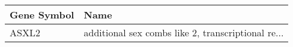 \begin{tabular}{ll}
\toprule
Gene Symbol &                                               Name \\
\midrule
      ASXL2 & additional sex combs like 2, transcriptional re... \\
\bottomrule
\end{tabular}
